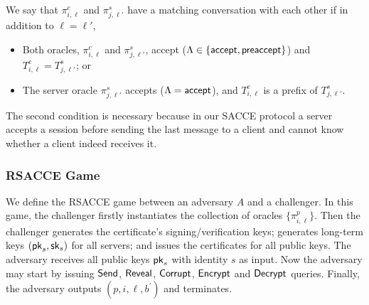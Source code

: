 \begin{definition}
 We say that $\pi^c_{i,\ell}$ and $\pi^s_{j,\ell'}$ have
 a matching conversation with each other if  in addition
 to $\ell=\ell'$,
 \begin{itemize}
  \item{Both oracles, $\pi^c_{i, \ell}$ and
  $\pi^s_{j,\ell'}$, accept ($\Lambda \in \{\mathsf{accept}, \mathsf{preaccept}\}$) and
  $T^c_{i,\ell} = T^s_{j,\ell'}$; or}

  \item{The server oracle $\pi^s_{j, \ell'}$ accepts
  ($\Lambda = \mathsf{accept}$),
  and $T^c_{i,\ell}$ is a prefix of $T^s_{j,\ell'}$.}
 \end{itemize}
\end{definition}
\begin{remark}
 The second condition is necessary because in our SACCE
 protocol a server accepts a session before sending the
 last message to a client and cannot know whether a
 client indeed receives it.
\end{remark}

\subsubsection{RSACCE Game}
We define the RSACCE game between an adversary $A$ and
a challenger.
In this game, the challenger firstly instantiates the
collection of oracles $\{\pi^p_{i,\ell}\}$.
Then the challenger generates the certificate's
signing/verification keys; generates long-term keys
$(\mathsf{pk}_s, \mathsf{sk}_s)$ for all servers; and issues the
certificates for all public keys.
The adversary receives all public keys $\mathsf{pk}_s$ with
identity $s$ as input.
Now the adversary may start by issuing $\mathsf{Send}$,
$\mathsf{Reveal}$, $\mathsf{Corrupt}$, $\mathsf{Encrypt}$ and $\mathsf{Decrypt}$ queries.
Finally, the adversary outputs
$(p, i, \ell, b^{\prime})$ and terminates.

